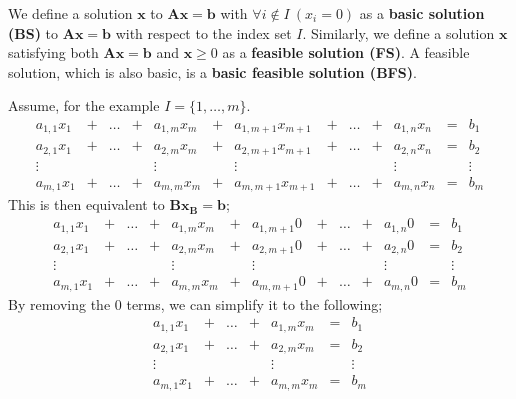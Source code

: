 \documentclass[a4paper, 12pt]{article}
\newcommand{\mat}[1]{\boldsymbol{#1}}
\renewcommand{\vec}[1]{\boldsymbol{#1}}
\begin{document}
            We define a solution $\vec{x}$ to $\mat{A}\vec{x} = \vec{b}$ with $\forall i \notin I\ (x_i = 0)$ as a \textbf{basic solution (BS)} to $\mat{A}\vec{x} = \vec{b}$ with respect to the index set $I$.
            Similarly, we define a solution $\vec{x}$ satisfying both $\mat{A}\vec{x} = \vec{b}$ and $\vec{x} \geq 0$ as a \textbf{feasible solution (FS)}.
            A feasible solution, which is also basic, is a \textbf{basic feasible solution (BFS)}.
            \medskip

            Assume, for the example $I = \{1, \dots, m\}$.
            $$\begin{matrix}
                a_{1, 1}x_1 & + & \dots & + & a_{1, m}x_m & + & a_{1, m + 1}x_{m + 1} & + & \dots & + & a_{1, n}x_n & = & b_1 \\
                a_{2, 1}x_1 & + & \dots & + & a_{2, m}x_m & + & a_{2, m + 1}x_{m + 1} & + & \dots & + & a_{2, n}x_n & = & b_2 \\
                \vdots & & & & \vdots & & \vdots & & & & \vdots & & \vdots \\
                a_{m, 1}x_1 & + & \dots & + & a_{m, m}x_m & + & a_{m, m + 1}x_{m + 1} & + & \dots & + & a_{m, n}x_n & = & b_m
            \end{matrix}$$
            This is then equivalent to $\mat{B}\vec{x_B} = \vec{b}$;
            $$\begin{matrix}
                a_{1, 1}x_1 & + & \dots & + & a_{1, m}x_m & + & a_{1, m + 1}0 & + & \dots & + & a_{1, n}0 & = & b_1 \\
                a_{2, 1}x_1 & + & \dots & + & a_{2, m}x_m & + & a_{2, m + 1}0 & + & \dots & + & a_{2, n}0 & = & b_2 \\
                \vdots & & & & \vdots & & \vdots & & & & \vdots & & \vdots \\
                a_{m, 1}x_1 & + & \dots & + & a_{m, m}x_m & + & a_{m, m + 1}0 & + & \dots & + & a_{m, n}0 & = & b_m
            \end{matrix}$$
            By removing the 0 terms, we can simplify it to the following;
            $$\begin{matrix}
                a_{1, 1}x_1 & + & \dots & + & a_{1, m}x_m & = & b_1 \\
                a_{2, 1}x_1 & + & \dots & + & a_{2, m}x_m & = & b_2 \\
                \vdots & & & & \vdots & & \vdots \\
                a_{m, 1}x_1 & + & \dots & + & a_{m, m}x_m & = & b_m
            \end{matrix}$$
\end{document}
